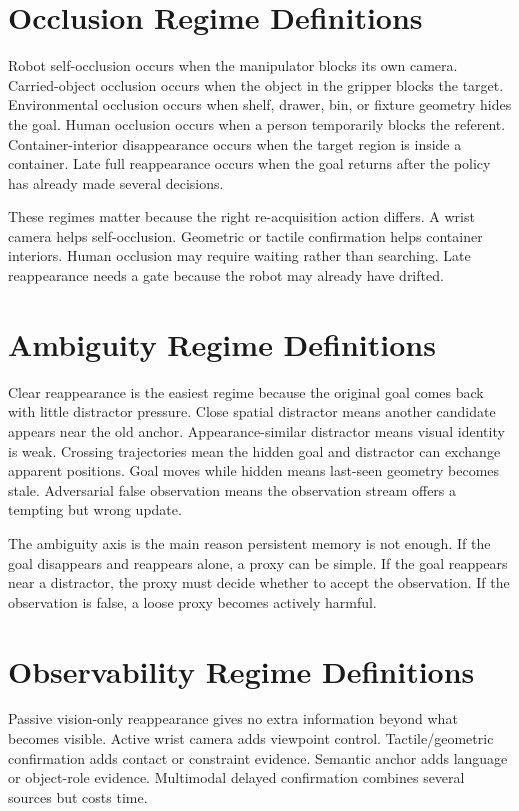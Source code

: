 \section{Occlusion Regime Definitions}

Robot self-occlusion occurs when the manipulator blocks its own camera. Carried-object occlusion occurs when the object in the gripper blocks the target. Environmental occlusion occurs when shelf, drawer, bin, or fixture geometry hides the goal. Human occlusion occurs when a person temporarily blocks the referent. Container-interior disappearance occurs when the target region is inside a container. Late full reappearance occurs when the goal returns after the policy has already made several decisions.

These regimes matter because the right re-acquisition action differs. A wrist camera helps self-occlusion. Geometric or tactile confirmation helps container interiors. Human occlusion may require waiting rather than searching. Late reappearance needs a gate because the robot may already have drifted.

\section{Ambiguity Regime Definitions}

Clear reappearance is the easiest regime because the original goal comes back with little distractor pressure. Close spatial distractor means another candidate appears near the old anchor. Appearance-similar distractor means visual identity is weak. Crossing trajectories mean the hidden goal and distractor can exchange apparent positions. Goal moves while hidden means last-seen geometry becomes stale. Adversarial false observation means the observation stream offers a tempting but wrong update.

The ambiguity axis is the main reason persistent memory is not enough. If the goal disappears and reappears alone, a proxy can be simple. If the goal reappears near a distractor, the proxy must decide whether to accept the observation. If the observation is false, a loose proxy becomes actively harmful.

\section{Observability Regime Definitions}

Passive vision-only reappearance gives no extra information beyond what becomes visible. Active wrist camera adds viewpoint control. Tactile/geometric confirmation adds contact or constraint evidence. Semantic anchor adds language or object-role evidence. Multimodal delayed confirmation combines several sources but costs time.

